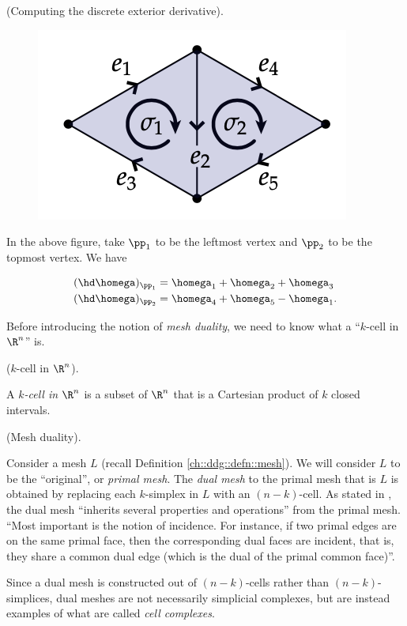 \begin{example}
    (Computing the discrete exterior derivative).
    
    \begin{figure}[H]
        \centering
        \includegraphics{images/Discrete_exterior_deriv_orientation.png}
    \end{figure}
    
    In the above figure, take $\pp_1$ to be the leftmost vertex and $\pp_2$ to be the topmost vertex. We have
    
    \begin{align*}
        (\hd\homega)_{\pp_1} &= \homega_1 + \homega_2 + \homega_3 \\
        (\hd\homega)_{\pp_2} &= \homega_4 + \homega_5 - \homega_1.
    \end{align*}
\end{example}

Before introducing the notion of \textit{mesh duality}, we need to know what a ``$k$-cell in $\R^n$'' is.

\begin{defn}
    ($k$-cell in $\R^n$).
    
    A \textit{$k$-cell in $\R^n$} is a subset of $\R^n$ that is a Cartesian product of $k$ closed intervals.
\end{defn}

\begin{defn}
    \scriptsize \cite{DDGArticle} \normalsize (Mesh duality).
    
    Consider a mesh $L$ (recall Definition \ref{ch::ddg::defn::mesh}). We will consider $L$ to be the ``original'', or \textit{primal mesh}. The \textit{dual mesh} to the primal mesh that is $L$ is obtained by replacing each $k$-simplex in $L$ with an $(n - k)$-cell. As stated in \cite{DDGArticle}, the dual mesh ``inherits several properties and operations'' from the primal mesh. ``Most important is the notion of incidence. For instance, if two primal edges are on the same primal face, then the corresponding dual faces are incident, that is, they share a common dual edge (which is the dual of the primal common face)''.
    
    Since a dual mesh is constructed out of $(n - k)$-cells rather than $(n - k)$-simplices, dual meshes are not necessarily simplicial complexes, but are instead examples of what are called \textit{cell complexes}. 
\end{defn}


